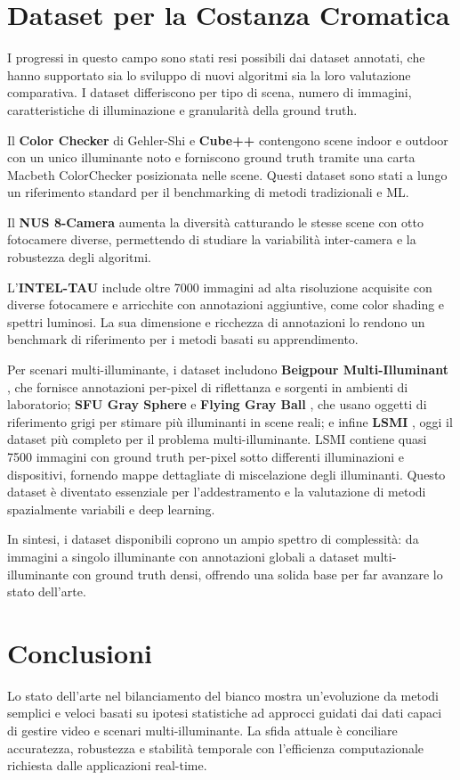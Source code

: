 \section{Dataset per la Costanza Cromatica}

I progressi in questo campo sono stati resi possibili dai dataset annotati, che hanno supportato sia lo sviluppo di nuovi algoritmi sia la loro valutazione comparativa. I dataset differiscono per tipo di scena, numero di immagini, caratteristiche di illuminazione e granularità della ground truth.

Il \textbf{Color Checker} di Gehler-Shi \cite{gehler_bayesian_2008} e \textbf{Cube++} \cite{ershov_cube_2020} contengono scene indoor e outdoor con un unico illuminante noto e forniscono ground truth tramite una carta Macbeth ColorChecker posizionata nelle scene. Questi dataset sono stati a lungo un riferimento standard per il benchmarking di metodi tradizionali e ML.

Il \textbf{NUS 8-Camera} \cite{cheng_illuminant_2014} aumenta la diversità catturando le stesse scene con otto fotocamere diverse, permettendo di studiare la variabilità inter-camera e la robustezza degli algoritmi.

L'\textbf{INTEL-TAU} \cite{laakom_intel-tau_2020} include oltre 7000 immagini ad alta risoluzione acquisite con diverse fotocamere e arricchite con annotazioni aggiuntive, come color shading e spettri luminosi. La sua dimensione e ricchezza di annotazioni lo rendono un benchmark di riferimento per i metodi basati su apprendimento.

Per scenari multi-illuminante, i dataset includono \textbf{Beigpour Multi-Illuminant} \cite{beigpour_multi-illuminant_2013}, che fornisce annotazioni per-pixel di riflettanza e sorgenti in ambienti di laboratorio; \textbf{SFU Gray Sphere} e \textbf{Flying Gray Ball} \cite{ciurea_large_2003,aghaei_flying_2020}, che usano oggetti di riferimento grigi per stimare più illuminanti in scene reali; e infine \textbf{LSMI} \cite{kim_large_2021}, oggi il dataset più completo per il problema multi-illuminante. LSMI contiene quasi 7500 immagini con ground truth per-pixel sotto differenti illuminazioni e dispositivi, fornendo mappe dettagliate di miscelazione degli illuminanti. Questo dataset è diventato essenziale per l'addestramento e la valutazione di metodi spazialmente variabili e deep learning.

In sintesi, i dataset disponibili coprono un ampio spettro di complessità: da immagini a singolo illuminante con annotazioni globali a dataset multi-illuminante con ground truth densi, offrendo una solida base per far avanzare lo stato dell'arte.

\section{Conclusioni}

Lo stato dell'arte nel bilanciamento del bianco mostra un'evoluzione da metodi semplici e veloci basati su ipotesi statistiche ad approcci guidati dai dati capaci di gestire video e scenari multi-illuminante. La sfida attuale è conciliare accuratezza, robustezza e stabilità temporale con l'efficienza computazionale richiesta dalle applicazioni real-time.


